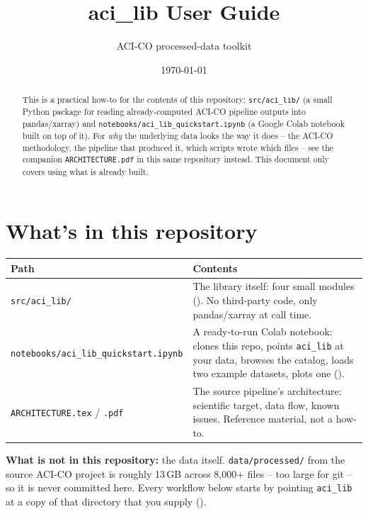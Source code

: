 \documentclass[11pt]{article}
\title{\textbf{aci\_lib User Guide}}
\author{ACI-CO processed-data toolkit}
\date{\today}
\begin{document}
\sloppy
\maketitle

\begin{abstract}
This is a practical how-to for the contents of this repository:
\texttt{src/aci\_lib/} (a small Python package for reading already-computed
ACI-CO pipeline outputs into pandas/xarray) and
\texttt{notebooks/aci\_lib\_quickstart.ipynb} (a Google Colab notebook built
on top of it). For \emph{why} the underlying data looks the way it does --
the ACI-CO methodology, the pipeline that produced it, which scripts wrote
which files -- see the companion \texttt{ARCHITECTURE.pdf} in this same
repository instead. This document only covers using what is already built.
\end{abstract}

\tableofcontents

\section{What's in this repository}

\begin{longtable}{@{}L{3.6cm}L{10.4cm}@{}}
\toprule
\textbf{Path} & \textbf{Contents} \\
\midrule
\endhead
\texttt{src/aci\_lib/} & The library itself: four small modules (). No third-party code, only pandas/xarray at call time. \\
\texttt{notebooks/aci\_lib\_\allowbreak quickstart.ipynb} & A ready-to-run Colab notebook: clones this repo, points \texttt{aci\_lib} at your data, browses the catalog, loads two example datasets, plots one (). \\
\texttt{ARCHITECTURE.tex} / \texttt{.pdf} & The source pipeline's architecture: scientific target, data flow, known issues. Reference material, not a how-to. \\
\bottomrule
\end{longtable}

\textbf{What is not in this repository:} the data itself. \texttt{data/processed/}
from the source ACI-CO project is roughly 13\,GB across 8{,}000+ files --
too large for git -- so it is never committed here. Every workflow below
starts by pointing \texttt{aci\_lib} at a copy of that directory that you
supply ().
\end{document}
